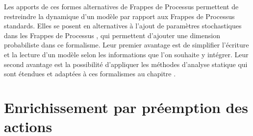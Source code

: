 Les apports de ces formes alternatives de Frappes de Processus permettent de restreindre la dynamique
d'un modèle par rapport aux Frappes de Processus standards.
Elles se posent en alternatives à l'ajout de paramètres stochastiques dans les Frappes de Processus
,
qui permettent d'ajouter une dimension probabiliste dans ce formalisme.
Leur premier avantage est de simplifier l'écriture et la lecture d'un modèle selon les informations
que l'on souhaite y intégrer.
Leur second avantage est la possibilité d'appliquer les méthodes d'analyse statique
qui sont étendues et adaptées à ces formalismes au chapitre .



\section{Enrichissement par préemption des actions}






